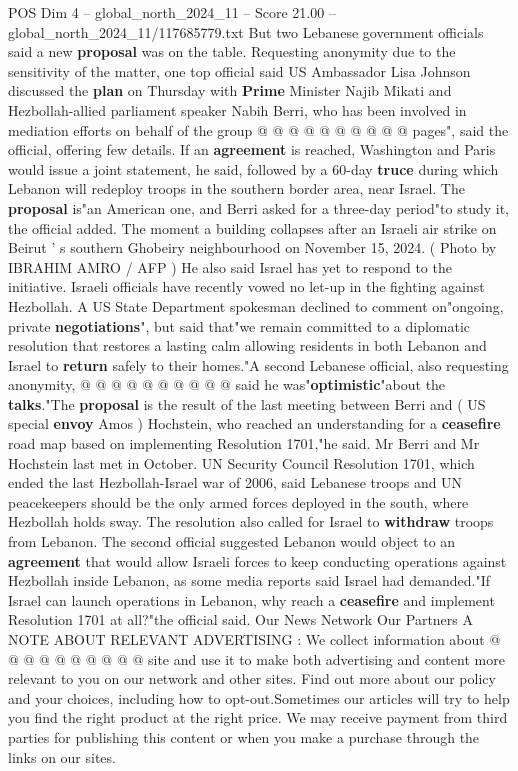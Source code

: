 \begin{textsample}{POS Dim 4 – global\_north\_2024\_11 – Score 21.00 – global\_north\_2024\_11/117685779.txt}
But two Lebanese government officials said a new \textbf{proposal} was on the table.
Requesting anonymity due to the sensitivity of the matter, one top official said US Ambassador Lisa Johnson discussed the \textbf{plan} on Thursday with \textbf{Prime} Minister Najib Mikati and Hezbollah-allied parliament speaker Nabih Berri, who has been involved in mediation efforts on behalf of the group @ @ @ @ @ @ @ @ @ @ pages", said the official, offering few details.
If an \textbf{agreement} is reached, Washington and Paris would issue a joint statement, he said, followed by a 60-day \textbf{truce} during which Lebanon will redeploy troops in the southern border area, near Israel.
The \textbf{proposal} is"an American one, and Berri asked for a three-day period"to study it, the official added.
The moment a building collapses after an Israeli air strike on Beirut ' s southern Ghobeiry neighbourhood on November 15, 2024. ( Photo by IBRAHIM AMRO / AFP ) He also said Israel has yet to respond to the initiative.
Israeli officials have recently vowed no let-up in the fighting against Hezbollah.
A US State Department spokesman declined to comment on"ongoing, private \textbf{negotiations}", but said that"we remain committed to a diplomatic resolution that restores a lasting calm allowing residents in both Lebanon and Israel to \textbf{return} safely to their homes."A second Lebanese official, also requesting anonymity, @ @ @ @ @ @ @ @ @ @ said he was"\textbf{optimistic}"about the \textbf{talks}."The \textbf{proposal} is the result of the last meeting between Berri and ( US special \textbf{envoy} Amos ) Hochstein, who reached an understanding for a \textbf{ceasefire} road map based on implementing Resolution 1701,"he said.
Mr Berri and Mr Hochstein last met in October.
UN Security Council Resolution 1701, which ended the last Hezbollah-Israel war of 2006, said Lebanese troops and UN peacekeepers should be the only armed forces deployed in the south, where Hezbollah holds sway.
The resolution also called for Israel to \textbf{withdraw} troops from Lebanon.
The second official suggested Lebanon would object to an \textbf{agreement} that would allow Israeli forces to keep conducting operations against Hezbollah inside Lebanon, as some media reports said Israel had demanded."If Israel can launch operations in Lebanon, why reach a \textbf{ceasefire} and implement Resolution 1701 at all?"the official said.
Our News Network Our Partners A NOTE ABOUT RELEVANT ADVERTISING : We collect information about @ @ @ @ @ @ @ @ @ @ site and use it to make both advertising and content more relevant to you on our network and other sites.
Find out more about our policy and your choices, including how to opt-out.Sometimes our articles will try to help you find the right product at the right price.
We may receive payment from third parties for publishing this content or when you make a purchase through the links on our sites.

\end{textsample}
